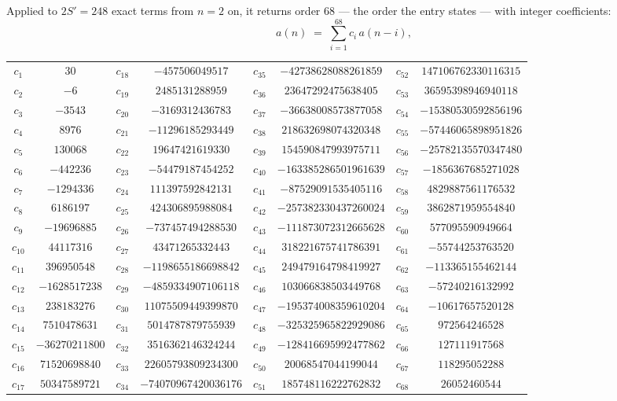 \documentclass[11pt,a4paper]{article}
\theoremstyle{plain}
\theoremstyle{definition}
\begin{document}
Applied to $2S'=248$ exact terms from $n=2$ on, it returns order $68$ --- the
order the entry states --- with integer coefficients:
\[
a(n)\;=\;\sum_{i=1}^{68}c_i\,a(n-i),
\]
\begin{center}\small
\begin{tabular}{cccccccc}
$c_{1}$ & $30$ & $c_{18}$ & $-457506049517$ & $c_{35}$ & $-42738628088261859$ & $c_{52}$ & $147106762330116315$ \\
$c_{2}$ & $-6$ & $c_{19}$ & $2485131288959$ & $c_{36}$ & $23647292475638405$ & $c_{53}$ & $36595398946940118$ \\
$c_{3}$ & $-3543$ & $c_{20}$ & $-3169312436783$ & $c_{37}$ & $-36638008573877058$ & $c_{54}$ & $-15380530592856196$ \\
$c_{4}$ & $8976$ & $c_{21}$ & $-11296185293449$ & $c_{38}$ & $218632698074320348$ & $c_{55}$ & $-57446065898951826$ \\
$c_{5}$ & $130068$ & $c_{22}$ & $19647421619330$ & $c_{39}$ & $154590847993975711$ & $c_{56}$ & $-25782135570347480$ \\
$c_{6}$ & $-442236$ & $c_{23}$ & $-54479187454252$ & $c_{40}$ & $-163385286501961639$ & $c_{57}$ & $-1856367685271028$ \\
$c_{7}$ & $-1294336$ & $c_{24}$ & $111397592842131$ & $c_{41}$ & $-87529091535405116$ & $c_{58}$ & $4829887561176532$ \\
$c_{8}$ & $6186197$ & $c_{25}$ & $424306895988084$ & $c_{42}$ & $-257382330437260024$ & $c_{59}$ & $3862871959554840$ \\
$c_{9}$ & $-19696885$ & $c_{26}$ & $-737457494288530$ & $c_{43}$ & $-111873072312665628$ & $c_{60}$ & $577095590949664$ \\
$c_{10}$ & $44117316$ & $c_{27}$ & $43471265332443$ & $c_{44}$ & $318221675741786391$ & $c_{61}$ & $-55744253763520$ \\
$c_{11}$ & $396950548$ & $c_{28}$ & $-1198655186698842$ & $c_{45}$ & $249479164798419927$ & $c_{62}$ & $-113365155462144$ \\
$c_{12}$ & $-1628517238$ & $c_{29}$ & $-4859334907106118$ & $c_{46}$ & $103066838503449768$ & $c_{63}$ & $-57240216132992$ \\
$c_{13}$ & $238183276$ & $c_{30}$ & $11075509449399870$ & $c_{47}$ & $-195374008359610204$ & $c_{64}$ & $-10617657520128$ \\
$c_{14}$ & $7510478631$ & $c_{31}$ & $5014787879755939$ & $c_{48}$ & $-325325965822929086$ & $c_{65}$ & $972564246528$ \\
$c_{15}$ & $-36270211800$ & $c_{32}$ & $3516362146324244$ & $c_{49}$ & $-128416695992477862$ & $c_{66}$ & $127111917568$ \\
$c_{16}$ & $71520698840$ & $c_{33}$ & $22605793809234300$ & $c_{50}$ & $20068547044199044$ & $c_{67}$ & $118295052288$ \\
$c_{17}$ & $50347589721$ & $c_{34}$ & $-74070967420036176$ & $c_{51}$ & $185748116222762832$ & $c_{68}$ & $26052460544$ \\
\end{tabular}
\end{center}
\end{document}
